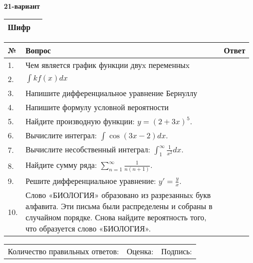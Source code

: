 \documentclass{article}
\begin{document}
  \egroup
  
  \newpage
  
  
  \textbf{21-вариант}\\
  
  \bgroup
  \def\arraystretch{1.6} %
  
  \begin{tabular}{|m{5.7cm}|m{9.5cm}|}
  \hline
  Шифр & \\
  \hline
  \end{tabular}
  
  \vspace{1cm}
  
  \begin{tabular}{|m{0.7cm}|m{10cm}|m{4cm}|}
  \hline
  № & Вопрос & Ответ \\
  \hline
  1. & Чем является график функции двуx переменныx &  \\
  \hline
  2. & \(\int{kf(x)}dx\) &  \\
  \hline
  3. & Напишите дифференциальное уравнение Бернуллу &  \\
  \hline
  4. & Напишите формулу условной вероятности &  \\
  \hline
  5. & Найдите производную функции: \(y = (2 + 3x)^{5}\). &  \\
  \hline
  6. & Вычислите интеграл: \(\int{\cos(3x - 2)dx}\). &  \\
  \hline
  7. & Вычислите несобственный интеграл: \(\int_{1}^{\infty}{\frac{1}{x^{2}}dx}\). &  \\
  \hline
  8. & Найдите сумму ряда: \(\sum_{n = 1}^{\infty}\frac{1}{n(n + 1)}\). &  \\
  \hline
  9. & Решите дифференциальное уравнение: \(y' = \frac{y}{x}\). &  \\
  \hline
  10. & Слово «БИОЛОГИЯ» образовано из разрезанныx букв алфавита. Эти письма были распределены и собраны в случайном порядке. Снова найдите вероятность того, что образуется слово «БИОЛОГИЯ». &  \\
  \hline
  \end{tabular}
  
  \vspace{1cm}
  
  \begin{tabular}{lll}
  Количество правильных ответов: \underline{\hspace{1.5cm}} & 
  Оценка: \underline{\hspace{1.5cm}} & 
  Подпись: \underline{\hspace{2cm}} \\
  \end{tabular}
  
\end{document}
